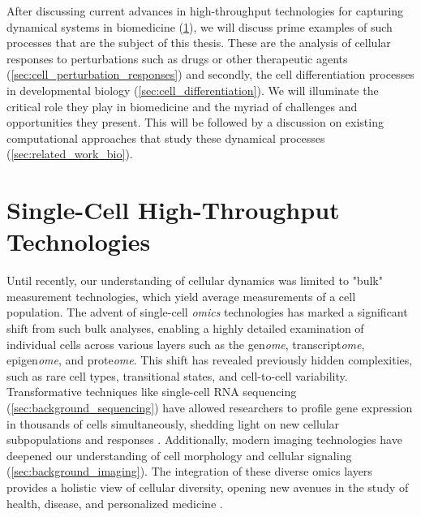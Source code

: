 After discussing current advances in high-throughput technologies for capturing dynamical systems in biomedicine (\cref{sec:tech_background}), we will discuss prime examples of such processes that are the subject of this thesis. 
These are the analysis of cellular responses to perturbations such as drugs or other therapeutic agents (\cref{sec:cell_perturbation_responses}) and secondly, the cell differentiation processes in developmental biology (\cref{sec:cell_differentiation}). We will illuminate the critical role they play in biomedicine and the myriad of challenges and opportunities they present. 
This will be followed by a discussion on existing computational approaches that study these dynamical processes (\cref{sec:related_work_bio}).


\section{Single-Cell High-Throughput Technologies}
\label{sec:tech_background}

Until recently, our understanding of cellular dynamics was limited to "bulk" measurement technologies, which yield average measurements of a cell population.
The advent of single-cell \textit{omics} technologies has marked a significant shift from such bulk analyses, enabling a highly detailed examination of individual cells across various layers such as the gen\textit{ome}, transcript\textit{ome}, epigen\textit{ome}, and prote\textit{ome}.
This shift has revealed previously hidden complexities, such as rare cell types, transitional states, and cell-to-cell variability. Transformative techniques like single-cell RNA sequencing (\cref{sec:background_sequencing}) have allowed researchers to profile gene expression in thousands of cells simultaneously, shedding light on new cellular subpopulations and responses \citep{jia2022high}.
Additionally, modern imaging technologies have deepened our understanding of cell morphology and cellular signaling (\cref{sec:background_imaging}). 
The integration of these diverse omics layers provides a holistic view of cellular diversity, opening new avenues in the study of health, disease, and personalized medicine \citep{baysoy2023technological}.

